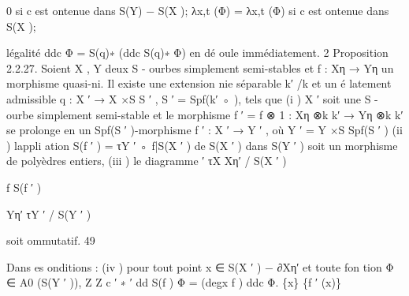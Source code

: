 \documentclass[
  10pt,
]{article}
\newenvironment{Shaded}{}{}
\newcommand{\NormalTok}[1]{#1}
\begin{document}
\begin{Shaded}
\begin{Highlighting}[]
\NormalTok{                             0         si c est ontenue dans S(Y) − S(X );}
\NormalTok{                λx,t (Φ) =}
\NormalTok{                             λx,t (Φ) si c est ontenue dans S(X );}

\NormalTok{l\textquotesingle{}égalité}
\NormalTok{                                     ddc Φ = S(q)∗ (ddc S(q)∗ Φ)}
\NormalTok{en dé oule immédiatement.                                                                            2}
\NormalTok{Proposition 2.2.27.  Soient X , Y deux S {-} ourbes simplement semi{-}stables et f : Xη →}
\NormalTok{Yη un morphisme quasi{-}ni. Il existe une extension nie séparable k′ /k et un é latement}
\NormalTok{admissible q : X ′ → X ×S S ′ , S ′ = Spf(k′ ◦ ), tels que}
\NormalTok{  (i ) X ′ soit une S {-} ourbe simplement semi{-}stable et le morphisme f ′ = f ⊗ 1 : Xη ⊗k k′ →}
\NormalTok{Yη ⊗k k′ se prolonge en un Spf(S ′ ){-}morphisme f ′ : X ′ → Y ′ , où Y ′ = Y ×S Spf(S ′ )}
\NormalTok{  (ii ) l\textquotesingle{}appli ation S(f ′ ) = τY ′ ◦ f|S(X ′ ) de S(X ′ ) dans S(Y ′ ) soit un morphisme de polyèdres}
\NormalTok{entiers,}
\NormalTok{  (iii ) le diagramme}
\NormalTok{                                                          ′}
\NormalTok{                                                         τX}
\NormalTok{                                            Xη′                     / S(X ′ )}

\NormalTok{                                            f                               S(f ′ )}
                                                                       
\NormalTok{                                            Yη′          τY ′}
\NormalTok{                                                                    / S(Y ′ )}

\NormalTok{soit ommutatif.}
\NormalTok{                                                                                                  49}



\NormalTok{  Dans es onditions :}
\NormalTok{  (iv ) pour tout point x ∈ S(X ′ ) − ∂Xη′ et toute fon tion Φ ∈ A0 (S(Y ′ )),}
\NormalTok{                          Z                              Z}
\NormalTok{                                   c   ′ ∗             ′}
\NormalTok{                              dd S(f ) Φ = (degx f )            ddc Φ.}
\NormalTok{                             \{x\}                                      \{f ′ (x)\}}


\end{Highlighting}
\end{Shaded}
\end{document}
